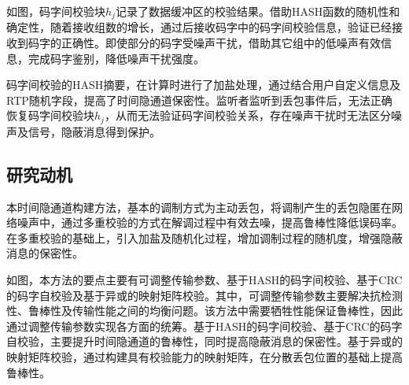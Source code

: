如图，码字间校验块$h_{j}$记录了数据缓冲区的校验结果。借助HASH函数的随机性和确定性，随着接收组数的增长，通过后接收码字中的码字间校验信息，验证已经接收到码字的正确性。即使部分的码字受噪声干扰，借助其它组中的低噪声有效信息，完成码字鉴别，降低噪声干扰强度。

码字间校验的HASH摘要，在计算时进行了加盐处理，通过结合用户自定义信息及RTP随机字段，提高了时间隐通道保密性。监听者监听到丢包事件后，无法正确恢复码字间校验块$h_{j}$，从而无法验证码字间校验关系，存在噪声干扰时无法区分噪声及信号，隐蔽消息得到保护。

\subsection{研究动机}
\label{chap:hash:motivation:motivation}

本时间隐通道构建方法，基本的调制方式为主动丢包，将调制产生的丢包隐匿在网络噪声中，通过多重校验的方式在解调过程中有效去噪，提高鲁棒性降低误码率。在多重校验的基础上，引入加盐及随机化过程，增加调制过程的随机度，增强隐蔽消息的保密性。


如图，本方法的要点主要有可调整传输参数、基于HASH的码字间校验、基于CRC的码字自校验及基于异或的映射矩阵校验。其中，可调整传输参数主要解决抗检测性、鲁棒性及传输性能之间的均衡问题。该方法中需要牺牲性能保证鲁棒性，因此通过调整传输参数实现各方面的统筹。基于HASH的码字间校验、基于CRC的码字自校验，主要提升时间隐通道的鲁棒性，同时提高隐蔽消息的保密性。基于异或的映射矩阵校验，通过构建具有校验能力的映射矩阵，在分散丢包位置的基础上提高鲁棒性。